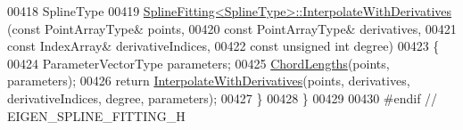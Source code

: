 \begin{DoxyCode}
00418   SplineType
00419   \hyperlink{group___splines___module_a7bd937fdcfa168dbdc27932886a4da9f}{SplineFitting<SplineType>::InterpolateWithDerivatives}
      (\textcolor{keyword}{const} PointArrayType& points,
00420                                                         \textcolor{keyword}{const} PointArrayType& derivatives,
00421                                                         \textcolor{keyword}{const} IndexArray& derivativeIndices,
00422                                                         \textcolor{keyword}{const} \textcolor{keywordtype}{unsigned} \textcolor{keywordtype}{int} degree)
00423   \{
00424     ParameterVectorType parameters;
00425     \hyperlink{group___splines___module_ga1b4cbde5d98411405871accf877552d2}{ChordLengths}(points, parameters);
00426     \textcolor{keywordflow}{return} \hyperlink{group___splines___module_a7bd937fdcfa168dbdc27932886a4da9f}{InterpolateWithDerivatives}(points, derivatives, derivativeIndices, 
      degree, parameters);
00427   \}
00428 \}
00429 
00430 \textcolor{preprocessor}{#endif // EIGEN\_SPLINE\_FITTING\_H}
\end{DoxyCode}
